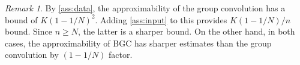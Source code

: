 \documentclass[10pt,a4paper]{amsart}
\numberwithin{equation}{section}
\theoremstyle{remark}
\newtheorem{remark}[remark]{Remark}
\begin{document}
\begin{remark}
By \cref{ass:data}, the approximability of the group convolution has a bound of $K(1-1/N)^{2}$.
Adding \cref{ass:input} to this provides $K(1-1/N)/n$ bound.
Since $n \geq N$, the latter is a sharper bound.
On the other hand, in both cases, the approximability of BGC has sharper estimates than the group convolution by $(1-1/N)$ factor.
\end{remark}
\end{document}
